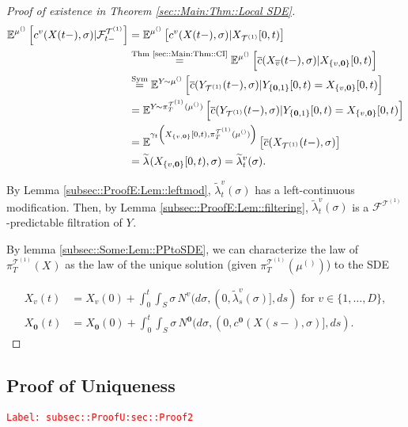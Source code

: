 \documentclass[12pt]{article}
\newcommand{\mb}{\mathbb}
\newcommand{\mc}{\mathcal}
\newcommand{\ov}{\overline}
\newcommand{\os}{\overset}
\newcommand{\te}{\text}
\newcommand{\tr}{\textcolor{red}}
\newcommand{\labe}[1]{\tr{\texttt{Label: #1}}}
\newcommand{\ind}{\hspace{24pt}}
\newcommand{\exmu}[2]{\mb{E}^{#1}\left[#2\right]}	%
\renewcommand{\root}{\mathbf{0}}				%
\renewcommand{\v}{v}							%
\renewcommand{\S}{S}							%
\newcommand{\s}{\sigma}							%
\newcommand{\T}{T}								%
\renewcommand{\t}{t}							%
\newcommand{\proj}{\pi}							%
\renewcommand{\tt}{s}							%
\newcommand{\F}{\mc{F}}							%
\newcommand{\X}{X}								%
\newcommand{\IGr}{c}							%
\newcommand{\vind}[1]{^{#1}}					%
\newcommand{\vsi}[1]{^{#1}}						%
\newcommand{\cind}[1]{_{#1}}					%
\newcommand{\cl}{\ov}							%
\newcommand{\tp}[1]{(#1)}						%
\newcommand{\tip}[1]{#1}						%
\newcommand{\ts}[1]{_{#1}}						%
\newcommand{\degr}{D}							%
\newcommand{\IGrg}{\ov{c}}						%
\newcommand{\tree}{\mc{T}}						%
\newcommand{\sln}[1]{^{(#1)}}					%
\newcommand{\poiss}{N}							%
\newcommand{\alt}[1]{\widetilde{#1}}			%
\newcommand{\m}{\mu}							%
\newcommand{\cm}{\gamma}						%
\newcommand{\XX}{Y}								%
\newcommand{\crate}{\alt{\lambda}}				%
\begin{document}
\begin{proof}[Proof of existence in Theorem \ref{sec::Main:Thm::Local SDE}]
\begin{align*}
\exmu{\m\sln{}\ts{}}{\IGr\vind{\v}(\X\cind{}\tp{\t-},\s)|\F\vsi{\tree\sln{1}}\ts{\t-}} &= \exmu{\m\sln{}\ts{}}{\IGr\vind{\v}(\X\cind{}\tp{\t-},\s)|\X\cind{\tree\sln{1}}\tip{[0,\t)}}\\
&\os{\te{Thm \ref{sec::Main:Thm::CI}}}{=} \exmu{\m\sln{}\ts{}}{\IGrg{}(\X\cind{\cl{\v}}\tp{\t-},\s)|\X\cind{\{\v,\root\}}\tip{[0,\t)}} \\
&\os{\te{Sym}}{=} \exmu{\XX\cind{}\tip{}\sim \m\sln{}\ts{}}{\IGrg{}(\XX\cind{\tree\sln{1}}\tp{\t-},\s)|\XX\cind{\{\root,1\}}\tip{[0,\t)} = \X\cind{\{\v,\root\}}\tip{[0,\t)}}\\
&= \exmu{\XX\cind{}\tip{}\sim \proj\vsi{\tree\sln{1}}\ts{\T}(\m\sln{}\ts{})}{\IGrg{}(\XX\cind{\tree\sln{1}}\tp{\t-},\s)|\XX\cind{\{\root,1\}}\tip{[0,\t)} = \X\cind{\{\v,\root\}}\tip{[0,\t)}}\\
&= \exmu{\cm\ts{\t}\left(\X\cind{\{\v,\root\}}\tip{[0,\t)},\proj\vsi{\tree\sln{1}}\ts{\T}(\m\sln{}\ts{})\right)}{\IGrg{}(\X\cind{\tree\sln{1}}\tp{\t-},\s)}\\
&=\crate\vind{}\ts{}(\X\cind{\{\v,\root\}}\tip{[0,\t)},\s) = \crate\vind{\v}\ts{\t}(\s).
\end{align*}

By Lemma \ref{subsec::ProofE:Lem::leftmod}, \(\crate\vind{\v}\ts{\t}(\s)\) has a left-continuous modification. Then, by Lemma \ref{subsec::ProofE:Lem::filtering}, \(\crate\vind{\v}\ts{\t}(\s)\) is a \(\F\vsi{\tree\sln{1}}\ts{}\)-predictable filtration of \(\XX\cind{}\tip{}\).

\ind By lemma \ref{subsec::Some:Lem::PPtoSDE}, we can characterize the law of \(\proj\vsi{\tree\sln{1}}\ts{\T}(\X\cind{}\tip{})\) as the law of the unique solution (given \(\proj\vsi{\tree\sln{1}}\ts{\T}(\m\sln{}\ts{})\)) to the SDE

\begin{align*}
\X\cind{\v}\tp{\t} &= \X\cind{\v}\tp{0} + \int_0^\t\int_\S \s\,\poiss\vind{\v}(d\s,(0,\crate\vind{\v}\ts{\tt}(\s)],d\tt) \te{ for } \v \in \{1,\dots,\degr\},\\
\X\cind{\root}\tp{\t} &= \X\cind{\root}\tp{0} + \int_0^\t\int_\S \s\,\poiss\vind{\root}(d\s,(0,\IGr\vind{\root}(\X\cind{}\tp{\tt-},\s)],d\tt).
\end{align*}
\end{proof}

\subsection{Proof of Uniqueness}
\label{subsec::ProofU:sec::Proof2}\labe{subsec::ProofU:sec::Proof2}
\end{document}
